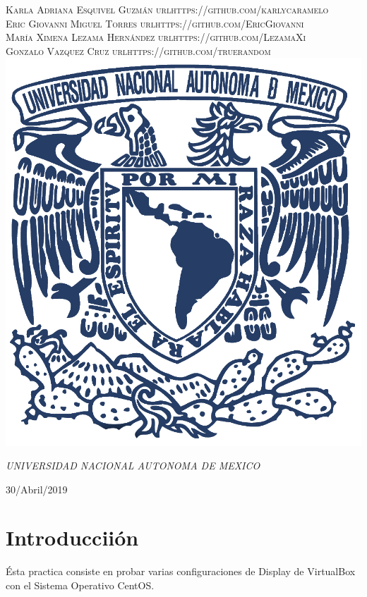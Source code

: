 \documentclass[a4paper, 11pt, oneside]{article}
\begin{document}
\begin{titlepage}
	{\scshape\Large Karla Adriana Esquivel Guzmán url{https://github.com/karlycaramelo} \\
    Eric Giovanni Miguel Torres url{https://github.com/EricGiovanni}\\ 
    María Ximena Lezama Hernández url{https://github.com/LezamaXi}\\ 
    Gonzalo Vazquez Cruz url{https://github.com/truerandom}}
	\vspace{0.5\baselineskip} 
	\vfill
	\includegraphics[scale=0.65]{unam.jpg}
	
	\textit{UNIVERSIDAD NACIONAL AUTONOMA DE MEXICO} 
	
	\vfill
	
	
	
	
	\vspace{0.3\baselineskip} 
	
    30/Abril/2019 
	
	 

\end{titlepage}
\section*{Introducciión}
Ésta practica consiste en probar varias configuraciones de Display de VirtualBox con el Sistema Operativo CentOS.
\end{document}
